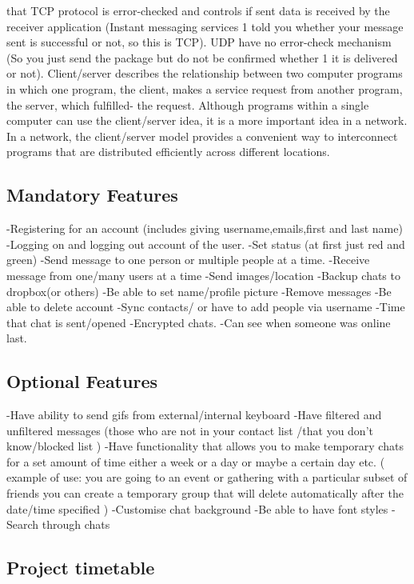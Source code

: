 \documentclass[11pt,a4paper]{article}
\begin{document}
that TCP protocol is error-checked and controls if sent data is received by
the receiver application (Instant messaging services 1 told you whether your
message sent is successful or not, so this is TCP). UDP have no error-check
mechanism (So you just send the package but do not be confirmed whether
1
it is delivered or not). Client/server describes the relationship between two
computer programs in which one program, the client, makes a service request
from another program, the server, which fulfilled- the request. Although
programs within a single computer can use the client/server idea, it is a more
important idea in a network. In a network, the client/server model provides
a convenient way to interconnect programs that are distributed efficiently
across different locations.
\subsection{Mandatory Features}
-Registering for an account (includes giving username,emails,first and last name)
-Logging on and logging out account of the user. 
-Set status (at first just red and green)
-Send message to one person or multiple people at a time.
-Receive message from one/many users at a time
-Send images/location
-Backup chats to dropbox(or others)
-Be able to set name/profile picture 
-Remove messages
-Be able to delete account
-Sync contacts/ or have to add people via username 
-Time that chat is sent/opened  
-Encrypted chats.
-Can see when someone was online last.


\subsection{Optional Features}
-Have ability to send gifs from external/internal keyboard
-Have filtered and unfiltered messages (those who are not in your contact list /that you don't know/blocked list )
-Have functionality that allows you to make temporary chats for a set amount of time either a week or a day or maybe a certain day etc. ( example of use: you are going to an event or gathering with a particular subset of friends you can create a temporary group that will delete automatically after the date/time specified )
-Customise chat background 
-Be able to have font styles
-Search through chats

\subsection{Project timetable}
\end{document}

